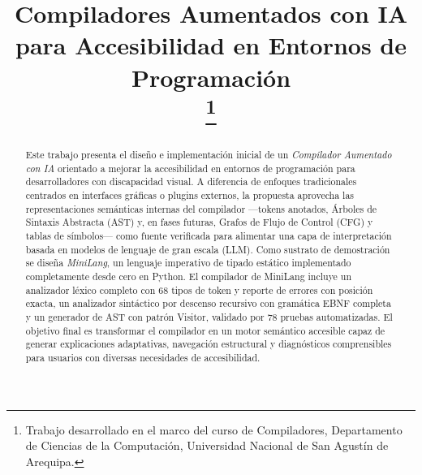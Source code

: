 \documentclass[conference]{IEEEtran}
\begin{document}
\title{Compiladores Aumentados con IA para Accesibilidad en Entornos de Programación\\
\thanks{Trabajo desarrollado en el marco del curso de Compiladores, Departamento de Ciencias de la Computación, Universidad Nacional de San Agustín de Arequipa.}
}

\author{


\and
{}

}

\maketitle

\begin{abstract}

Este trabajo presenta el diseño e implementación inicial de un \textit{Compilador Aumentado con IA} orientado a mejorar la accesibilidad en entornos de programación para desarrolladores con discapacidad visual. A diferencia de enfoques tradicionales centrados en interfaces gráficas o plugins externos, la propuesta aprovecha las representaciones semánticas internas del compilador —tokens anotados, Árboles de Sintaxis Abstracta (AST) y, en fases futuras, Grafos de Flujo de Control (CFG) y tablas de símbolos— como fuente verificada para alimentar una capa de interpretación basada en modelos de lenguaje de gran escala (LLM). Como sustrato de demostración se diseña \textit{MiniLang}, un lenguaje imperativo de tipado estático implementado completamente desde cero en Python. El compilador de MiniLang incluye un analizador léxico completo con 68 tipos de token y reporte de errores con posición exacta, un analizador sintáctico por descenso recursivo con gramática EBNF completa y un generador de AST con patrón Visitor, validado por 78 pruebas automatizadas. El objetivo final es transformar el compilador en un motor semántico accesible capaz de generar explicaciones adaptativas, navegación estructural y diagnósticos comprensibles para usuarios con diversas necesidades de accesibilidad.

\end{abstract}
\end{document}
